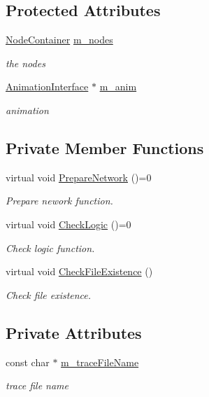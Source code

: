 \subsection*{Protected Attributes}
\begin{DoxyCompactItemize}
\item 
\hyperlink{classns3_1_1NodeContainer}{Node\+Container} \hyperlink{classAbstractAnimationInterfaceTestCase_aa051bd1bbd7f335a863a168c27167b38}{m\+\_\+nodes}
\begin{DoxyCompactList}\small\item\em the nodes \end{DoxyCompactList}\item 
\hyperlink{classns3_1_1AnimationInterface}{Animation\+Interface} $\ast$ \hyperlink{classAbstractAnimationInterfaceTestCase_a88244a79a411132a7ffe535ee8d582a2}{m\+\_\+anim}
\begin{DoxyCompactList}\small\item\em animation \end{DoxyCompactList}\end{DoxyCompactItemize}
\subsection*{Private Member Functions}
\begin{DoxyCompactItemize}
\item 
virtual void \hyperlink{classAbstractAnimationInterfaceTestCase_af9fb9b43d1f48224178f9e19692039a6}{Prepare\+Network} ()=0
\begin{DoxyCompactList}\small\item\em Prepare nework function. \end{DoxyCompactList}\item 
virtual void \hyperlink{classAbstractAnimationInterfaceTestCase_af73fefe5a3102faf87c72f789bc138bd}{Check\+Logic} ()=0
\begin{DoxyCompactList}\small\item\em Check logic function. \end{DoxyCompactList}\item 
virtual void \hyperlink{classAbstractAnimationInterfaceTestCase_a1e9b57502f430e0b136b0e2a1149bc7a}{Check\+File\+Existence} ()
\begin{DoxyCompactList}\small\item\em Check file existence. \end{DoxyCompactList}\end{DoxyCompactItemize}
\subsection*{Private Attributes}
\begin{DoxyCompactItemize}
\item 
const char $\ast$ \hyperlink{classAbstractAnimationInterfaceTestCase_a8ca75c3705c912ec58c2302c9137f3b4}{m\+\_\+trace\+File\+Name}
\begin{DoxyCompactList}\small\item\em trace file name \end{DoxyCompactList}\end{DoxyCompactItemize}
